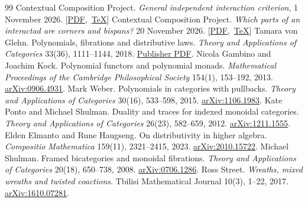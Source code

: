 \documentclass[11pt]{article}
\numberwithin{equation}{section}
\theoremstyle{definition}\newtheorem{definition}[theorem]{Definition}
\begin{document}
\begin{thebibliography}{99}
 Contextual Composition Project.
\emph{General independent interaction criterion}, 1 November 2026.
\mbox{[\href{https://github.com/eternal-november/eos-research-programmes/blob/a336bd6c661895d9b86827123dd38ebd8ea2a8fa/projects/contextual-composition/interaction/independent-criterion/General_Independent_Interaction_Criterion.pdf}{PDF}, \href{https://github.com/eternal-november/eos-research-programmes/blob/a336bd6c661895d9b86827123dd38ebd8ea2a8fa/projects/contextual-composition/interaction/independent-criterion/General_Independent_Interaction_Criterion.tex}{TeX}]}
 Contextual Composition Project.
\emph{Which parts of an interactad are corners and bispans?} 20 November 2026.
\mbox{[\href{https://github.com/eternal-november/eos-research-programmes/blob/a336bd6c661895d9b86827123dd38ebd8ea2a8fa/projects/contextual-composition/interaction/independent-criterion/Relative_Corners_and_Bispans_Comparison.pdf}{PDF}, \href{https://github.com/eternal-november/eos-research-programmes/blob/a336bd6c661895d9b86827123dd38ebd8ea2a8fa/projects/contextual-composition/interaction/independent-criterion/Relative_Corners_and_Bispans_Comparison.tex}{TeX}]}
 Tamara von Glehn. Polynomials, fibrations and distributive laws. \emph{Theory and Applications of Categories} 33(36), 1111--1144, 2018. \href{https://tac.mta.ca/tac/volumes/33/36/33-36.pdf}{Publisher PDF}.
 Nicola Gambino and Joachim Kock. Polynomial functors and polynomial monads. \emph{Mathematical Proceedings of the Cambridge Philosophical Society} 154(1), 153--192, 2013. \href{https://arxiv.org/abs/0906.4931}{arXiv:0906.4931}.
 Mark Weber. Polynomials in categories with pullbacks. \emph{Theory and Applications of Categories} 30(16), 533--598, 2015. \href{https://arxiv.org/abs/1106.1983}{arXiv:1106.1983}.
 Kate Ponto and Michael Shulman. Duality and traces for indexed monoidal categories. \emph{Theory and Applications of Categories} 26(23), 582--659, 2012. \href{https://arxiv.org/abs/1211.1555}{arXiv:1211.1555}.
 Elden Elmanto and Rune Haugseng. On distributivity in higher algebra. \emph{Compositio Mathematica} 159(11), 2321--2415, 2023. \href{https://arxiv.org/abs/2010.15722}{arXiv:2010.15722}.
 Michael Shulman. Framed bicategories and monoidal fibrations. \emph{Theory and Applications of Categories} 20(18), 650--738, 2008. \href{https://arxiv.org/abs/0706.1286}{arXiv:0706.1286}.
 Ross Street. \emph{Wreaths, mixed wreaths and twisted coactions}. Tbilisi Mathematical Journal 10(3), 1--22, 2017. \href{https://arxiv.org/abs/1610.07281}{arXiv:1610.07281}.

\end{thebibliography}
\end{document}
